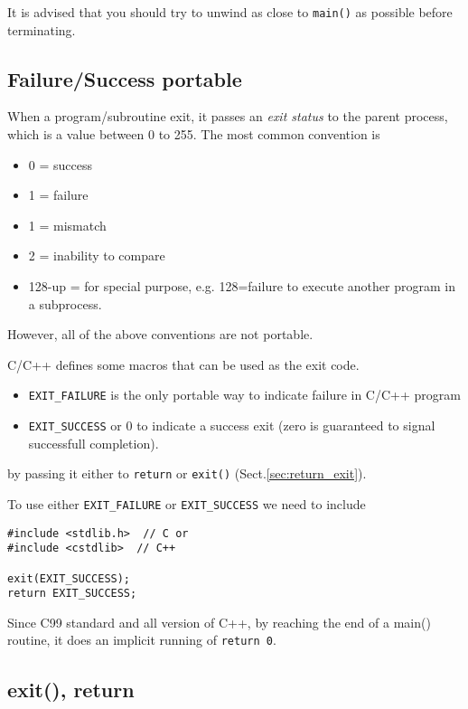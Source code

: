 It is advised that you should try to unwind as close to \verb!main()! as
possible before terminating.


\subsection{Failure/Success portable}

When a program/subroutine exit, it passes an {\it exit status} to the parent
process, which is a value between 0 to 255. The most common convention is 
\begin{itemize}
  \item 0 = success
  \item 1 = failure
  \item 1 = mismatch
  \item 2 = inability to compare
  \item 128-up = for special purpose, e.g. 128=failure to execute another
  program in a subprocess.
\end{itemize}
However, all of the above conventions are not portable.

C/C++ defines some macros that can be used as the exit code. 
\begin{itemize}
  \item  \verb!EXIT_FAILURE! is the only portable way to indicate failure in
  C/C++ program
  
   \item \verb!EXIT_SUCCESS! or 0 to indicate a success exit  (zero is
   guaranteed to signal successfull completion). 
\end{itemize}
by passing it either to \verb!return! or \verb!exit()!
(Sect.\ref{sec:return_exit}).

To use either \verb!EXIT_FAILURE! or \verb!EXIT_SUCCESS! we need to include
\begin{verbatim}
#include <stdlib.h>  // C or
#include <cstdlib>  // C++

exit(EXIT_SUCCESS); 
return EXIT_SUCCESS;
\end{verbatim}

Since C99 standard and all version of C++, by reaching the end of a main()
routine, it does an implicit running of \verb!return 0!.  

\subsection{exit(), return}
\label{sec_return_exit}

